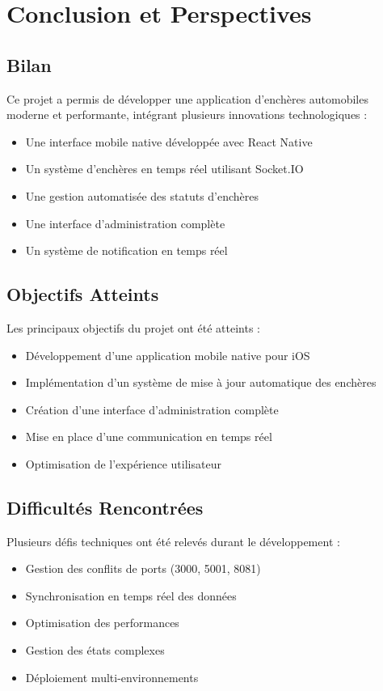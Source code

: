 \chapter{Conclusion et Perspectives}

\section{Bilan}
Ce projet a permis de développer une application d'enchères automobiles moderne et performante, intégrant plusieurs innovations technologiques :

\begin{itemize}
    \item Une interface mobile native développée avec React Native
    \item Un système d'enchères en temps réel utilisant Socket.IO
    \item Une gestion automatisée des statuts d'enchères
    \item Une interface d'administration complète
    \item Un système de notification en temps réel
\end{itemize}

\section{Objectifs Atteints}
Les principaux objectifs du projet ont été atteints :

\begin{itemize}
    \item Développement d'une application mobile native pour iOS
    \item Implémentation d'un système de mise à jour automatique des enchères
    \item Création d'une interface d'administration complète
    \item Mise en place d'une communication en temps réel
    \item Optimisation de l'expérience utilisateur
\end{itemize}

\section{Difficultés Rencontrées}
Plusieurs défis techniques ont été relevés durant le développement :

\begin{itemize}
    \item Gestion des conflits de ports (3000, 5001, 8081)
    \item Synchronisation en temps réel des données
    \item Optimisation des performances
    \item Gestion des états complexes
    \item Déploiement multi-environnements
\end{itemize}

